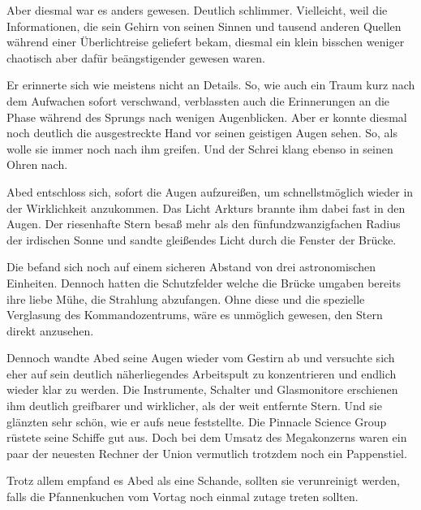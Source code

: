 \par

Aber diesmal war es anders gewesen. Deutlich schlimmer. Vielleicht, weil die Informationen, die sein Gehirn von seinen Sinnen und tausend anderen Quellen während einer Überlichtreise geliefert bekam, diesmal ein klein bisschen weniger chaotisch aber dafür beängstigender gewesen waren.

\par

Er erinnerte sich wie meistens nicht an Details. So, wie auch ein Traum kurz nach dem Aufwachen sofort verschwand, verblassten auch die Erinnerungen an die Phase während des Sprungs nach wenigen Augenblicken. Aber er konnte diesmal noch deutlich die ausgestreckte Hand vor seinen geistigen Augen sehen. So, als wolle sie immer noch nach ihm greifen. Und der Schrei klang ebenso in seinen Ohren nach.

\par

Abed entschloss sich, sofort die Augen aufzureißen, um schnellstmöglich wieder in der Wirklichkeit anzukommen. Das Licht Arkturs brannte ihm dabei fast in den Augen. Der riesenhafte Stern besaß mehr als den fünfundzwanzigfachen Radius der irdischen Sonne und sandte gleißendes Licht durch die Fenster der Brücke.

\par

Die  befand sich noch auf einem sicheren Abstand von drei astronomischen Einheiten. Dennoch hatten die Schutzfelder welche die Brücke umgaben bereits ihre liebe Mühe, die Strahlung abzufangen. Ohne diese und die spezielle Verglasung des Kommandozentrums, wäre es unmöglich gewesen, den Stern direkt anzusehen.

\par

Dennoch wandte Abed seine Augen wieder vom Gestirn ab und versuchte sich eher auf sein deutlich näherliegendes Arbeitspult zu konzentrieren und endlich wieder klar zu werden. Die Instrumente, Schalter und Glasmonitore erschienen ihm deutlich greifbarer und wirklicher, als der weit entfernte Stern. Und sie glänzten sehr schön, wie er aufs neue feststellte. Die Pinnacle Science Group rüstete seine Schiffe gut aus. Doch bei dem Umsatz des Megakonzerns waren ein paar der neuesten Rechner der Union vermutlich trotzdem noch ein Pappenstiel.

\par

Trotz allem empfand es Abed als eine Schande, sollten sie verunreinigt werden, falls die Pfannenkuchen vom Vortag noch einmal zutage treten sollten.

